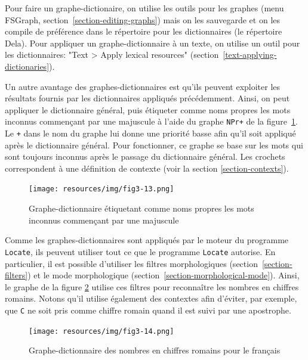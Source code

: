\bigskip
\noindent Pour faire un graphe-dictionaire, on utilise les outils pour les graphes (menu FSGraph, section~\ref{section-editing-graphs})
mais on les sauvegarde et on les compile de préférence dans le répertoire pour les dictionnaires (le répertoire Dela).
Pour appliquer un graphe-dic\-tion\-naire à un texte, on utilise un outil pour les dictionnaires: "Text > Apply lexical resources" (section~\ref{text-applying-dictionaries}).
\bigskip

\noindent Un autre avantage des graphes-dictionnaires est qu’ils peuvent exploiter les résultats
fournis par les dictionnaires appliqués précédemment. Ainsi, on peut appliquer le dictionnaire
général, puis étiqueter comme noms propres les mots inconnus commençant par une majuscule à l’aide
du graphe \verb$NPr+$ de la figure~\ref{graph-NPr}. Le \verb$+$ dans le nom du graphe lui donne une
priorité basse afin qu’il soit appliqué après le dictionnaire général. Pour fonctionner, ce graphe
se base sur les mots qui sont toujours inconnus après le passage du dictionnaire général. Les
crochets correspondent à une définition de contexte (voir la section \ref{section-contexts}).

\begin{figure}[!ht]
\begin{center}
\texttt{[image: resources/img/fig3-13.png]}
\caption{Graphe-dictionnaire étiquetant comme noms propres les mots inconnus commençant par une
majuscule
\label{graph-NPr}}
\end{center}
\end{figure}

\bigskip
\noindent Comme les graphes-dictionnaires sont appliqués par le moteur du programme \verb+Locate+,
ils peuvent utiliser tout ce que le programme \verb+Locate+ autorise. En particulier, il est
possible d’utiliser les filtres morphologiques
(section~\ref{section-filters}) et le mode morphologique
(section~\ref{section-morphological-mode}).
Ainsi, le graphe de la figure \ref{graph-CR} utilise ces filtres pour reconnaître les nombres en
chiffres romains. Notons qu’il utilise également des contextes afin d’éviter, par exemple, que
\verb+C+ ne soit pris comme chiffre romain quand il est suivi par une apostrophe.

\begin{figure}[!p]
\begin{center}
\texttt{[image: resources/img/fig3-14.png]}
\caption{Graphe-dictionnaire des nombres en chiffres romains pour le français\label{graph-CR}}
\end{center}
\end{figure}

